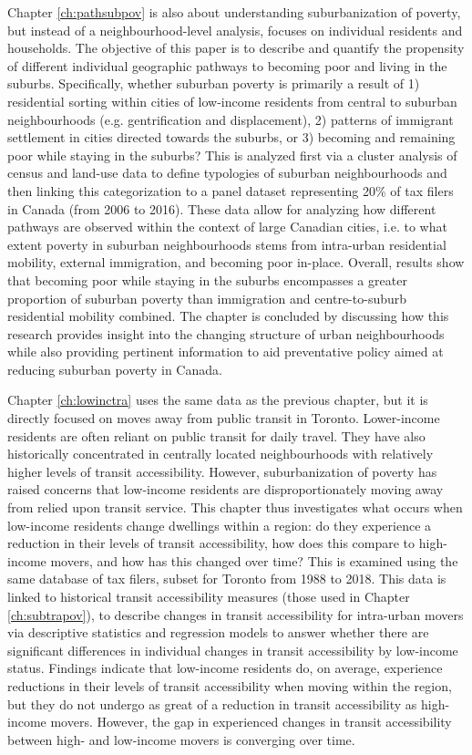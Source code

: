Chapter \ref{ch:pathsubpov} is also about understanding suburbanization of poverty, but instead of a neighbourhood-level analysis, focuses on individual residents and households. The objective of this paper is to describe and quantify the propensity of different individual geographic pathways to becoming poor and living in the suburbs. Specifically, whether suburban poverty is primarily a result of 1) residential sorting within cities of low-income residents from central to suburban neighbourhoods (e.g. gentrification and displacement), 2) patterns of immigrant settlement in cities directed towards the suburbs, or 3) becoming and remaining poor while staying in the suburbs?  This is analyzed first via a cluster analysis of census and land-use data to define typologies of suburban neighbourhoods and then linking this categorization to a panel dataset representing 20\% of tax filers in Canada (from 2006 to 2016). These data allow for analyzing how different pathways are observed within the context of large Canadian cities, i.e. to what extent poverty in suburban neighbourhoods stems from intra-urban residential mobility, external immigration, and becoming poor in-place. Overall, results show that becoming poor while staying in the suburbs encompasses a greater proportion of suburban poverty than immigration and centre-to-suburb residential mobility combined. The chapter is concluded by discussing how this research provides insight into the changing structure of urban neighbourhoods while also providing pertinent information to aid preventative policy aimed at reducing suburban poverty in Canada.

Chapter \ref{ch:lowinctra} uses the same data as the previous chapter, but it is directly focused on moves away from public transit in Toronto. Lower-income residents are often reliant on public transit for daily travel. They have also historically concentrated in centrally located neighbourhoods with relatively higher levels of transit accessibility. However, suburbanization of poverty has raised concerns that low-income residents are disproportionately moving away from relied upon transit service. This chapter thus investigates what occurs when low-income residents change dwellings within a region: do they experience a reduction in their levels of transit accessibility, how does this compare to high-income movers, and how has this changed over time? This is examined using the same database of tax filers, subset for Toronto from 1988 to 2018. This data is linked to historical transit accessibility measures (those used in Chapter \ref{ch:subtrapov}), to describe changes in transit accessibility for intra-urban movers via descriptive statistics and regression models to answer whether there are significant differences in individual changes in transit accessibility by low-income status. Findings indicate that low-income residents do, on average, experience reductions in their levels of transit accessibility when moving within the region, but they do not undergo as great of a reduction in transit accessibility as high-income movers. However, the gap in experienced changes in transit accessibility between high- and low-income movers is converging over time.

